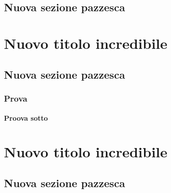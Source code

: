 \documentclass[a4paper, 11pt, openright, twoside]{report}
\begin{document}
\lipsum[1]

\section[Nuova sezione pazzesca]{Nuova sezione pazzesca}
\label{chap:Nuova sezione pazzesca}

\lipsum[1-2]


\chapter[Nuovo titolo incredibile]{Nuovo titolo incredibile}
\label{chap:Nuovo titolo incredibile}

\lipsum[1]

\section[Nuova sezione pazzesca]{Nuova sezione pazzesca}
\label{chap:Nuova sezione pazzesca}

\subsection[Prova]{Prova}
\label{chap:Prova}

\subsubsection[Proova sotto]{Proova sotto}
\label{chap:Proova sotto}



\lipsum[1-9]

\chapter[Nuovo titolo incredibile]{Nuovo titolo incredibile}
\label{chap:Nuovo titolo incredibile}

\lipsum[1]

\section[Nuova sezione pazzesca]{Nuova sezione pazzesca}
\label{chap:Nuova sezione pazzesca}

\lipsum[1-2]
\end{document}
